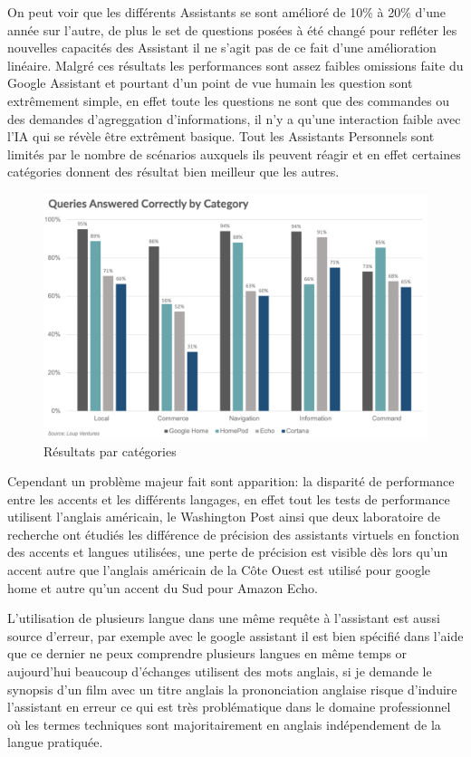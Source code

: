 On peut voir que les différents Assistants se sont amélioré de 10\% à 20\% d'une année sur l'autre,
de plus le set de questions posées à été changé pour refléter les nouvelles capacités des Assistant
il ne s'agit pas de ce fait d'une amélioration linéaire. Malgré ces résultats les performances
sont assez faibles omissions faite du Google Assistant et pourtant d'un point de vue
humain les question sont extrêmement simple, en effet toute les questions ne sont que des commandes ou
des demandes d'agreggation d'informations, il n'y a qu'une interaction faible avec l'IA qui se révèle
être extrêment basique. Tout les Assistants Personnels sont limités par le nombre de scénarios auxquels
ils peuvent réagir et en effet certaines catégories donnent des résultat bien meilleur que les
autres.

\begin{figure}[H]
    \centering
    \includegraphics[width=1.0\textwidth]{Images/vaquerybycategory}
    \caption{Résultats par catégories}
    \label{fig:watsonlogo}
\end{figure}

Cependant un problème majeur fait sont apparition: la disparité de performance entre les accents
et les différents langages, en effet tout les tests de performance utilisent l'anglais américain,
le Washington Post ainsi que deux laboratoire de recherche ont étudiés les différence
de précision des assistants virtuels en fonction des accents et langues utilisées, une
perte de précision est visible dès lors qu'un accent autre que l'anglais américain de la Côte Ouest
est utilisé pour google home et autre qu'un accent du Sud pour Amazon Echo. \newline

L'utilisation de plusieurs langue dans une même requête à l'assistant est aussi source 
d'erreur, par exemple avec le google assistant il est bien spécifié dans l'aide 
que ce dernier ne peux comprendre plusieurs langues en même temps or aujourd'hui beaucoup
d'échanges utilisent des mots anglais, si je demande le synopsis d'un film avec 
un titre anglais la prononciation anglaise risque d'induire l'assistant en erreur ce qui
est très problématique dans le domaine professionnel où les termes techniques 
sont majoritairement en anglais indépendement de la langue pratiquée. 



